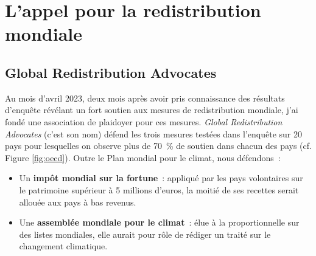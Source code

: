 \documentclass[a5paper,french]{memoir}
\begin{document}


\chapter{L'appel pour la redistribution mondiale\label{ch:appel}}

\section{Global Redistribution Advocates}

Au mois d'avril 2023, deux mois après avoir pris connaissance des résultats d'enquête révélant un fort soutien aux mesures de redistribution mondiale, j'ai fondé une association de plaidoyer pour ces mesures. \textit{Global Redistribution Advocates} (c'est son nom) défend les trois mesures testées dans l'enquête sur 20 pays pour lesquelles on observe plus de 70~\% de soutien dans chacun des pays (cf. Figure \ref{fig:oecd}). Outre le Plan mondial pour le climat, nous défendons~: 
\begin{itemize}
  \item Un \textbf{impôt mondial sur la fortune}~: appliqué par les pays volontaires sur le patrimoine supérieur à 5 millions d'euros, la moitié de ses recettes serait allouée aux pays à bas revenus.
  \item Une \textbf{assemblée mondiale pour le climat}~: élue à la proportionnelle sur des listes mondiales, elle aurait pour rôle de rédiger un traité sur le changement climatique.
\end{itemize}
\end{document}
